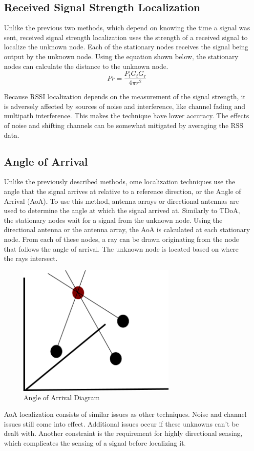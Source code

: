 \subsection{Received Signal Strength Localization}
Unlike the previous two methods, which depend on knowing the time a signal was sent, received signal strength localization uses the strength of a received signal to localize the unknown node\cite{local_conf}. Each of the stationary nodes receives the signal being output by the unknown node. Using the equation shown below\cite{rss_calc}, the stationary nodes can calculate the distance to the unknown node.
\[Pr = \frac{P_t G_t G_r}{4πr^2} \]\par
Because RSSI localization depends on the measurement of the signal strength, it is adversely affected by sources of noise and interference, like channel fading and multipath interference\cite{local_conf}. This makes the technique have lower accuracy. The effects of noise and shifting channels can be somewhat mitigated by averaging the RSS data.

\subsection{Angle of Arrival}
Unlike the previously described methods, ome localization techniques use the angle that the signal arrives at relative to a reference direction, or the Angle of Arrival (AoA)\cite{local_aoa}. To use this method, antenna arrays or directional antennas are used to determine the angle at which the signal arrived at. Similarly to TDoA, the stationary nodes wait for a signal from the unknown node. Using the directional antenna or the antenna array, the AoA is calculated at each stationary node. From each of these nodes, a ray can be drawn originating from the node that follows the angle of arrival. The unknown node is located based on where the rays intersect.
\begin{figure}[ht]
\centering
\includegraphics[width=0.70\textwidth]{img/path4188.png}
\caption{Angle of Arrival Diagram}
\label{fig:aoa_diagram}
\end{figure}\par
AoA localization consists of similar issues as other techniques. Noise and channel issues still come into effect. Additional issues occur if these unknowns can’t be dealt with. Another constraint is the requirement for highly directional sensing, which complicates the sensing of a signal before localizing it.

